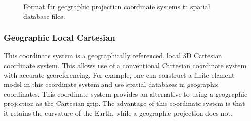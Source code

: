 \begin{figure}[H]
\caption{Format for geographic projection coordinate systems in spatial database
files.}
\end{figure}



\subsubsection{Geographic Local Cartesian}

This coordinate system is a geographically referenced, local 3D Cartesian
coordinate system. This allows use of a conventional Cartesian coordinate
system with accurate georeferencing. For example, one can construct
a finite-element model in this coordinate system and use spatial databases
in geographic coordinates. This coordinate system provides an alternative
to using a geographic projection as the Cartesian grip. The advantage
of this coordinate system is that it retains the curvature of the
Earth, while a geographic projection does not.
